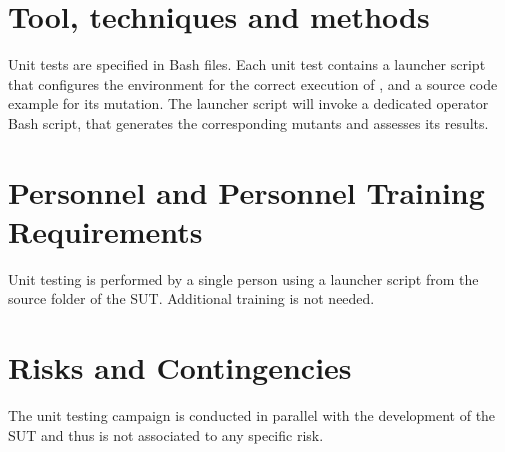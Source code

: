 \section{Tool, techniques and methods}

Unit tests are specified in Bash files. Each unit test contains a launcher script that configures the environment for the correct execution of \FAQAS, and a source code example for its mutation. The launcher script will invoke a dedicated operator Bash script, that generates the corresponding mutants and assesses its results.


\section{Personnel and Personnel Training Requirements}

Unit testing is performed by a single person using a launcher script from the source folder of the SUT. Additional training is not needed.

\section{Risks and Contingencies}

The unit testing campaign is conducted in parallel with the development of the SUT and thus is not associated to any specific risk.